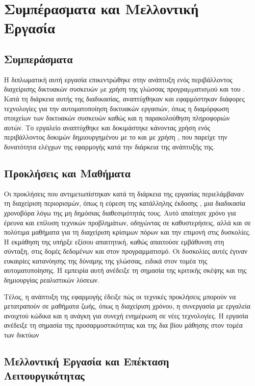 
\chapter{Συμπέρασματα και Μελλοντική Εργασία}

\section{Συμπεράσματα}

Η διπλωματική αυτή εργασία επικεντρώθηκε στην ανάπτυξη ενός περιβάλλοντος διαχείρισης δικτυακών συσκευών µε χρήση της γλώσσας προγραµµατισµού  και του . Κατά τη διάρκεια αυτής της διαδικασίας, αναπτύχθηκαν και εφαρμόστηκαν διάφορες τεχνολογίες για την αυτοματοποίηση δικτυακών εργασιών, όπως η διαμόρφωση στοιχείων των δικτυακών συσκευών καθώς και η παρακολούθηση πληροφοριών αυτών. Το εργαλείο αναπτύχθηκε και δοκιμάστηκε κάνοντας χρήση ενός περιβάλλοντος δοκιμών δημιουργημένου με το  και με χρήση , που παρείχε την δυνατότητα ελέγχων της εφαρμογής κατά την διάρκεια της ανάπτυξής της.

\section{Προκλήσεις και Μαθήματα}


Οι προκλήσεις που αντιμετωπίστηκαν κατά τη διάρκεια της 
εργασίας περιελάμβαναν τη διαχείριση περιορισμών, όπως η 
εύρεση της κατάλληλης έκδοσης , μια διαδικασία 
χρονοβόρα λόγω της μη δημόσιας διαθεσιμότητάς τους. 
Αυτό απαίτησε χρόνο για έρευνα και επίλυση τεχνικών προβλημάτων, 
οδηγώντας σε καθυστερήσεις, αλλά και σε πολύτιμα μαθήματα για τη 
διαχείριση κρίσιμων πόρων και την επιμονή στις δυσκολίες. Η εκμάθηση 
της  υπήρξε εξίσου απαιτητική, καθώς απαιτούσε 
εμβάθυνση στη σύνταξη, στις δομές δεδομένων και στον προγραμματισμό. 
Οι δυσκολίες αυτές έγιναν ευκαιρίες κατανόησης της δύναμης της 
γλώσσας, ειδικά στον τομέα της αυτοματοποίησης. Η εμπειρία αυτή 
ανέδειξε τη σημασία της κριτικής σκέψης και της δημιουργίας 
ρεαλιστικών λύσεων.

Τέλος, η ανάπτυξη της εφαρμογής έδειξε πώς οι 
τεχνικές προκλήσεις μπορούν να μετατραπούν σε μαθήματα ζωής, 
όπως η διαχείριση χρόνου, η συνεργασία με εργαλεία ανοιχτού 
κώδικα και η ανάγκη για συνεχή ενημέρωση σε νέες τεχνολογίες. 
Η εργασία ανέδειξε τη σημασία της προσαρμοστικότητας και της 
δια βίου μάθησης στον τομέα των δικτύων

\section{Μελλοντική Εργασία και Επέκταση Λειτουργικότητας}

